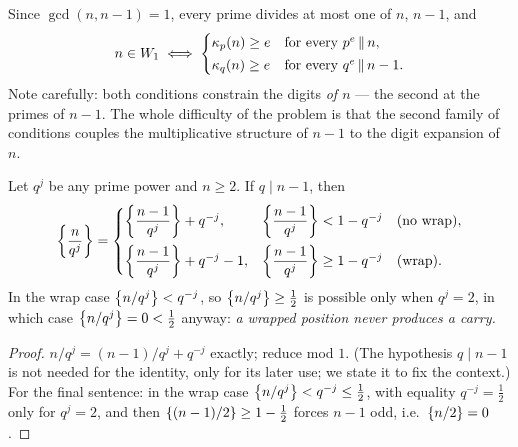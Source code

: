 \begin{definition}\label{def:W1-criterion}
Since $\gcd(n,n-1)=1$, every prime divides at most one of $n$, $n-1$, and
\[
n\in W_1
\iff
\begin{cases}
\kappa_p(n)\ge e & \text{for every }p^e\,\|\,n,\\[2pt]
\kappa_q(n)\ge e & \text{for every }q^e\,\|\,n-1.
\end{cases}
\]
Note carefully: both conditions constrain the digits \emph{of $n$} --- the
second at the primes of $n-1$. The whole difficulty of the problem is that
the second family of conditions couples the multiplicative structure of
$n-1$ to the digit expansion of $n$.
\end{definition}

\begin{lemma}\label{lem:shift}
\statusP\quad
Let $q^j$ be any prime power and $n\ge2$. If $q\mid n-1$, then
\[
\left\{\frac{n}{q^j}\right\}
=\begin{cases}
\left\{\dfrac{n-1}{q^j}\right\}+q^{-j}, &
\left\{\dfrac{n-1}{q^j}\right\}<1-q^{-j}\quad(\text{no wrap}),\\[10pt]
\left\{\dfrac{n-1}{q^j}\right\}+q^{-j}-1, &
\left\{\dfrac{n-1}{q^j}\right\}\ge1-q^{-j}\quad(\text{wrap}).
\end{cases}
\]
In the wrap case $\left\{n/q^j\right\}<q^{-j}$, so $\left\{n/q^j\right\}\ge\tfrac12$ is possible
only when $q^j=2$, in which case $\left\{n/q^j\right\}=0<\tfrac12$ anyway: \emph{a
wrapped position never produces a carry.}
\end{lemma}

\begin{proof}
$n/q^j=(n-1)/q^j+q^{-j}$ exactly; reduce mod $1$. (The hypothesis
$q\mid n-1$ is not needed for the identity, only for its later use; we
state it to fix the context.) For the final sentence: in the wrap case
$\left\{n/q^j\right\}<q^{-j}\le\tfrac12$, with equality $q^{-j}=\tfrac12$ only for
$q^j=2$, and then $\left\{(n-1)/2\right\}\ge1-\tfrac12$ forces $n-1$ odd, i.e.\
$\left\{n/2\right\}=0$.
\end{proof}

